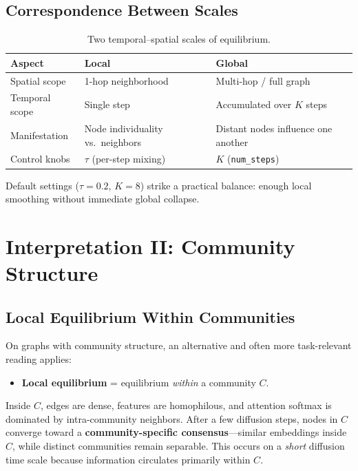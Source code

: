 \documentclass[11pt,a4paper]{report}
\begin{document}
\subsection{Correspondence Between Scales}

\begin{table}[h]
\centering
\caption{Two temporal--spatial scales of equilibrium.}
\begin{tabular}{@{}lll@{}}
\toprule
\textbf{Aspect} & \textbf{Local} & \textbf{Global} \\
\midrule
Spatial scope   & 1-hop neighborhood        & Multi-hop / full graph \\
Temporal scope  & Single step               & Accumulated over $K$ steps \\
Manifestation   & Node individuality vs.\ neighbors & Distant nodes influence one another \\
Control knobs   & $\tau$ (per-step mixing)  & $K$ (\texttt{num\_steps}) \\
\bottomrule
\end{tabular}
\end{table}

Default settings ($\tau = 0.2$, $K = 8$) strike a practical balance: enough local smoothing without immediate global collapse.

\section{Interpretation II: Community Structure}

\subsection{Local Equilibrium Within Communities}

On graphs with community structure, an alternative and often more task-relevant reading applies:
\begin{itemize}[noitemsep]
    \item \textbf{Local equilibrium} = equilibrium \emph{within} a community $C$.
\end{itemize}

Inside $C$, edges are dense, features are homophilous, and attention softmax is dominated by intra-community neighbors. After a few diffusion steps, nodes in $C$ converge toward a \textbf{community-specific consensus}---similar embeddings inside $C$, while distinct communities remain separable. This occurs on a \emph{short} diffusion time scale because information circulates primarily within $C$.
\end{document}
